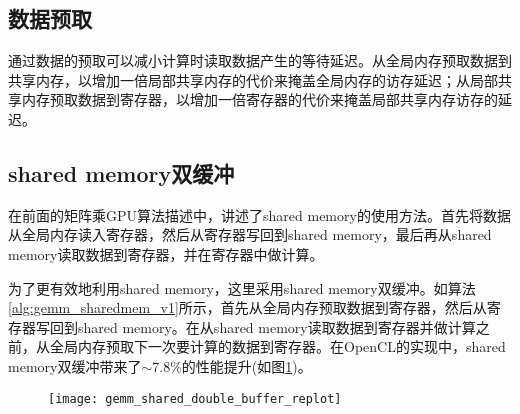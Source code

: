 \subsection{数据预取}
通过数据的预取可以减小计算时读取数据产生的等待延迟。从全局内存预取数据到共享内存，以增加一倍局部共享内存的代价来掩盖全局内存的访存延迟；从局部共享内存预取数据到寄存器，以增加一倍寄存器的代价来掩盖局部共享内存访存的延迟。

\subsection{shared memory双缓冲}
在前面的矩阵乘GPU算法描述中，讲述了shared memory的使用方法。首先将数据从全局内存读入寄存器，然后从寄存器写回到shared memory，最后再从shared memory读取数据到寄存器，并在寄存器中做计算。

为了更有效地利用shared memory，这里采用shared memory双缓冲。如算法\ref{alg:gemm_sharedmem_v1}所示，首先从全局内存预取数据到寄存器，然后从寄存器写回到shared memory。在从shared memory读取数据到寄存器并做计算之前，从全局内存预取下一次要计算的数据到寄存器。在OpenCL的实现中，shared memory双缓冲带来了$\sim$7.8\%的性能提升(如图\ref{fig:gemm_shared_double_buffer_replot})。
\begin{figure}[htbp]
	\centering
	\texttt{[image: gemm\_shared\_double\_buffer\_replot]}
	\label{fig:gemm_shared_double_buffer_replot}
\end{figure}

